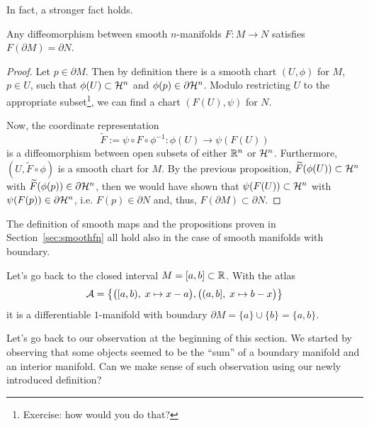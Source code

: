 In fact, a stronger fact holds.
\begin{proposition}
  Any diffeomorphism between smooth $n$-manifolds $F: M \to N$ satisfies $F(\partial M) = \partial N$.
\end{proposition}
\begin{proof}
  Let $p\in\partial M$.
  Then by definition there is a smooth chart $(U,\phi)$ for $M$, $p\in U$, such that $\phi(U)\subset\mathcal{H}^n$ and $\phi(p)\in\partial\mathcal{H}^n$.
  Modulo restricting $U$ to the appropriate subset\footnote{Exercise: how would you do that?}, we can find a chart $(F(U), \psi)$ for $N$.

  Now, the coordinate representation
  \begin{equation}
    \widetilde{F} := \psi \circ F \circ \phi^{-1} : \phi(U) \to \psi(F(U))
  \end{equation}
  is a diffeomorphism between open subsets of either $\mathbb{R}^n$ or $\mathcal{H}^n$.
  Furthermore, $(U, \widetilde{F}\circ\phi)$ is a smooth chart for $M$.
  By the previous proposition, $\widetilde{F}(\phi(U))\subset \mathcal{H}^n$ with $\widetilde{F}(\phi(p))\in\partial \mathcal{H}^n$, then we would have shown that $\psi(F(U)) \subset \mathcal{H}^n$ with $\psi(F(p))\in\partial\mathcal{H}^n$, i.e. $F(p)\in \partial N$ and, thus, $F(\partial M)\subset \partial N$.
\end{proof}

\begin{remark}
  The definition of smooth maps and the propositions proven in Section~\ref{sec:smoothfn} all hold also in the case of smooth manifolds with boundary.
\end{remark}

\begin{example}\label{ex:mfldbdryinterval}
  Let's go back to the closed interval $M=[a,b]\subset\mathbb{R}$.
  With the atlas
  \begin{equation}
    \mathcal{A}=\big\{
    \big([a,b), \; x\mapsto x-a\big),
    \big((a,b], \; x\mapsto b-x\big)
    \big\}
  \end{equation}
  it is a differentiable $1$-manifold with boundary $\partial M = \{a\} \cup \{b\} = \{a, b\}$.
\end{example}

Let's go back to our observation at the beginning of this section.
We started by observing that some objects seemed to be the ``sum'' of a boundary manifold and an interior manifold.
Can we make sense of such observation using our newly introduced definition?

